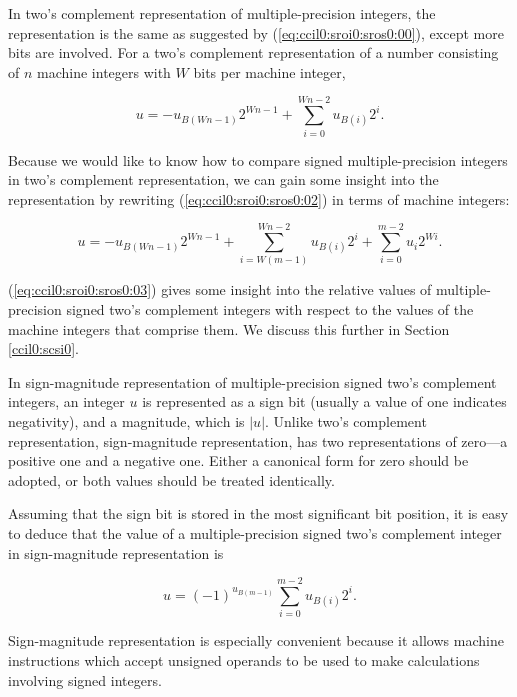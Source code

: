 In two's complement representation of multiple-precision integers,
the representation is the same as suggested by 
(\ref{eq:ccil0:sroi0:sros0:00}), except
more bits are involved.  For a two's complement representation
of a number consisting of $n$ machine integers with $W$ bits per
machine integer,

\begin{equation}
\label{eq:ccil0:sroi0:sros0:02}
u = - u_{B(Wn-1)} 2^{Wn-1} + \sum_{i=0}^{Wn-2} u_{B(i)} 2^i .
\end{equation}

Because we would like to know how to compare signed multiple-precision
integers in two's complement representation, we can gain some
insight into the representation by rewriting 
(\ref{eq:ccil0:sroi0:sros0:02}) in terms of machine integers:

\begin{equation}
\label{eq:ccil0:sroi0:sros0:03}
u = - u_{B(Wn-1)} 2^{Wn-1} 
+ 
\sum_{i=W(m-1)}^{Wn-2} u_{B(i)} 2^i 
+
\sum_{i=0}^{m-2} u_{i} 2^{Wi} .
\end{equation}

(\ref{eq:ccil0:sroi0:sros0:03}) gives some insight into the
relative values of multiple-precision signed two's complement
integers with respect to the values of the machine integers
that comprise them.  We discuss this further in
Section \ref{ccil0:scsi0}.

In sign-magnitude representation of multiple-precision signed two's
complement integers, an integer $u$ is represented as a sign
bit (usually a value of one indicates negativity), and a magnitude, 
which is $|u|$.  Unlike two's complement representation,
sign-magnitude representation, has two representations of zero---a positive
one and a negative one.  Either a canonical form for zero should be
adopted, or both values should be treated identically.

Assuming that the sign bit is stored in the most significant bit position,
it is easy to deduce that the value of a multiple-precision
signed two's complement integer in sign-magnitude representation is

\begin{equation}
\label{eq:ccil0:sros0:srou0:04}
u = (-1)^{u_{B(m-1)}} \sum_{i=0}^{m-2} u_{B(i)} 2^i .
\end{equation}

Sign-magnitude representation is especially convenient because
it allows machine instructions which accept unsigned operands to be used
to make calculations involving signed integers.



